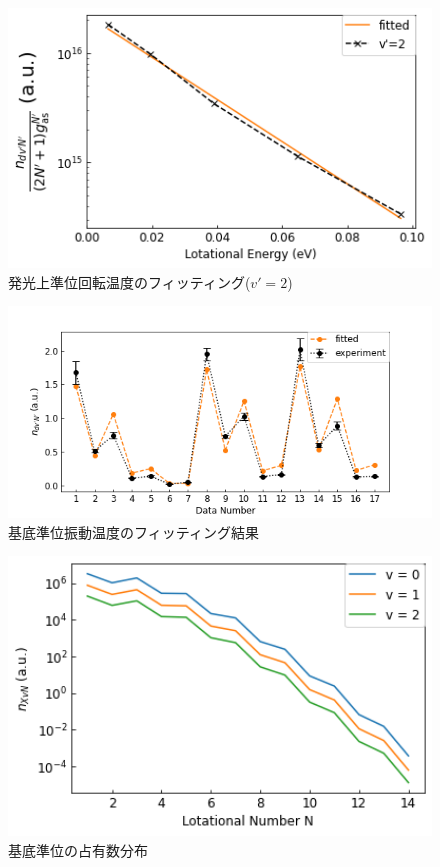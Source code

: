 \begin{figure}
    \centering
    \includegraphics[width=15cm]{pictures/upper-fitting-2.png}
    \caption{発光上準位回転温度のフィッティング($v'=2$)}
    \label{fig:upper-fitting-2}
\end{figure}

\begin{figure}
    \centering
    \includegraphics[width=15cm]{pictures/fitting-result.png}
    \caption{基底準位振動温度のフィッティング結果}
    \label{fig:fitting-result}
\end{figure}

\begin{figure}
    \centering
    \includegraphics[width=15cm]{pictures/ground-state-n.png}
    \caption{基底準位の占有数分布}
    \label{fig:ground-state-n}
\end{figure}

